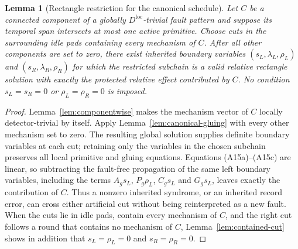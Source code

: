\documentclass[aps,prx,reprint,superscriptaddress,nofootinbib,floatfix,longbibliography]{revtex4-2}
\newtheorem{lemma}[theorem]{Lemma}
\theoremstyle{definition}
\begin{document}
\begin{lemma}[Rectangle restriction for the canonical schedule]
\label{lem:rectangle-restriction}
Let $C$ be a connected component of a globally $D^{\mathrm{loc}}$-trivial fault
pattern and suppose its temporal span intersects at most one active primitive.
Choose cuts in the surrounding idle pads containing every mechanism of $C$.
After all other components are set to zero, there exist inherited boundary
variables $(s_L,\lambda_L,\rho_L)$ and $(s_R,\lambda_R,\rho_R)$ for which the
restricted subchain is a valid relative rectangle solution with exactly the
protected relative effect contributed by $C$.  No condition $s_L=s_R=0$ or
$\rho_L=\rho_R=0$ is imposed.
\end{lemma}
\begin{proof}
Lemma~\ref{lem:componentwise} makes the mechanism vector of $C$ locally
detector-trivial by itself.  Apply Lemma~\ref{lem:canonical-gluing} with every
other mechanism set to zero.  The resulting global solution supplies
definite boundary variables at each cut; retaining only the variables in the
chosen subchain preserves all local primitive and gluing equations.
Equations (A15a)--(A15c) are linear, so subtracting the fault-free propagation
of the same left boundary variables, including the terms $A_gs_L$,
$P_g\rho_L$, $C_gs_L$ and $G_gs_L$, leaves exactly the contribution of $C$.
Thus a nonzero inherited syndrome, or an inherited record error, can cross
either artificial cut without being reinterpreted as a new fault.  When the
cuts lie in idle pads, contain every mechanism of $C$, and the right cut
follows a round that contains no mechanism of $C$,
Lemma~\ref{lem:contained-cut} shows in addition that $s_L=\rho_L=0$ and
$s_R=\rho_R=0$.
\end{proof}
\end{document}
